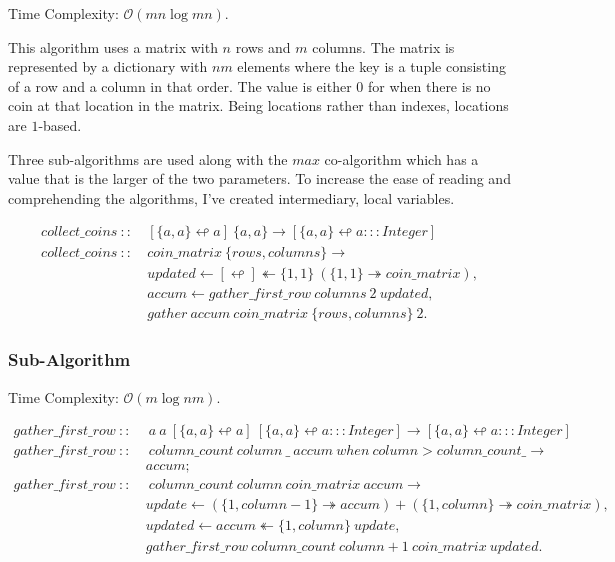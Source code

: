 \documentclass[a4paper,10pt]{book}
\newcommand\when{\  when\ }
\begin{document}
Time Complexity: $\mathcal{O}(mn\log mn)$.

This algorithm uses a matrix with $n$ rows and $m$ columns. The matrix is represented by a dictionary with $nm$ elements where the key is a tuple consisting of a row and a column in that order. The value is either $0$ for when there is no coin at that location in the matrix. Being locations rather than indexes, locations are $1$-based.

Three sub-algorithms are used along with the $max$ co-algorithm which has a value that is the larger of the two parameters. To increase the ease of reading and comprehending the algorithms, I've created intermediary, local variables.

\begin{align*}
collect\_coins\ ::\ &[\{a,a\}\looparrowleft a]\ \{a,a\}\rightarrow
	[\{a,a\}\looparrowleft a:::Integer]\\
collect\_coins\ ::\ &coin\_matrix\ \{rows,columns\}\rightarrow\\
	&updated\leftarrow [\looparrowleft ]\twoheadleftarrow \{1,1\}\ (\{1,1\}\twoheadrightarrow coin\_matrix),\\
	&accum\leftarrow gather\_first\_row\ columns\ 2\ updated,\\
	&gather\ accum\ coin\_matrix\ \{rows,columns\}\ 2. 
\end{align*}


\subsubsection{Sub-Algorithm}

Time Complexity: $\mathcal{O}(m\log nm)$.

\begin{align*}
gather\_first\_row\ ::\ &\ a\ a\ [\{a,a\}\looparrowleft a]\ [\{a,a\}\looparrowleft a:::Integer]\rightarrow [\{a,a\}\looparrowleft a:::Integer]\\
gather\_first\_row\ ::\ &\ column\_count\ column\ \_\ accum \when column>column\_count \_\rightarrow\\
	&accum;\\
gather\_first\_row\ ::\ &\ column\_count\ column\ coin\_matrix\ accum\rightarrow\\
	&update\leftarrow (\{1,column-1\}\twoheadrightarrow accum) +(\{1,column\}\twoheadrightarrow coin\_matrix),\\
	&updated\leftarrow accum\twoheadleftarrow \{1,column\}\ update,\\
	&gather\_first\_row\ column\_count\ column+1\ coin\_matrix\ updated.
\end{align*}
\end{document}
